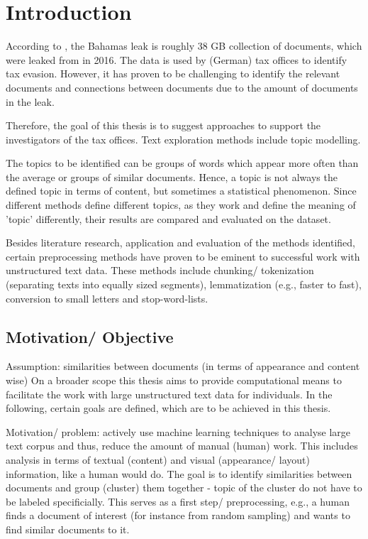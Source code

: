\chapter{Introduction}\label{ch:introduction}

According to \cite{data-corpus-bahamas-leaks}, the Bahamas leak is roughly 38 GB collection of documents, which were leaked from in 2016.
The data is used by (German) tax offices to identify tax evasion.
However, it has proven to be challenging to identify the relevant documents and connections between documents due to the amount of documents in the leak.

Therefore, the goal of this thesis is to suggest approaches to support the investigators of the tax offices.
Text exploration methods include topic modelling.

The topics to be identified can be groups of words which appear more often than the average or groups of similar documents.
Hence, a topic is not always the defined topic in terms of content, but sometimes a statistical phenomenon.
Since different methods define different topics, as they work and define the meaning of 'topic' differently, 
their results are compared and evaluated on the dataset.

Besides literature research, application and evaluation of the methods identified, 
certain preprocessing methods have proven to be eminent to successful work with unstructured text data.
These methods include chunking/ tokenization (separating texts into equally sized segments), lemmatization (e.g., faster to fast), 
conversion to small letters and stop-word-lists.

\section{Motivation/ Objective}\label{sec:motivation}

Assumption: similarities between documents (in terms of appearance and content wise)
On a broader scope this thesis aims to provide computational means to facilitate the work with large unstructured text data for individuals.
In the following, certain goals are defined, which are to be achieved in this thesis.

Motivation/ problem: actively use machine learning techniques to analyse large text corpus and thus, reduce the amount of manual (human) work.
This includes analysis in terms of textual (content) and visual (appearance/ layout) information, like a human would do.
The goal is to identify similarities between documents and group (cluster) them together - topic of the cluster do not have to be labeled specificially.
This serves as a first step/ preprocessing, e.g., a human finds a document of interest (for instance from random sampling) and wants to find similar documents to it.


